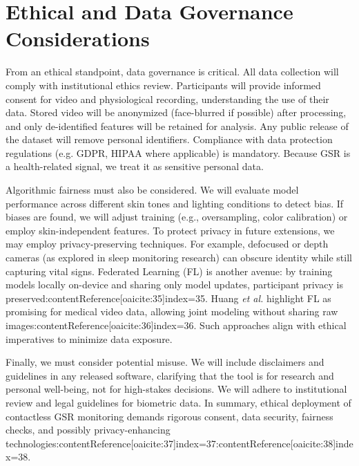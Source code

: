 \documentclass[12pt]{article}
\begin{document}
    \section{Ethical and Data Governance Considerations}
    From an ethical standpoint, data governance is critical. All data collection will comply with institutional ethics review. Participants will provide informed consent for video and physiological recording, understanding the use of their data. Stored video will be anonymized (face-blurred if possible) after processing, and only de-identified features will be retained for analysis. Any public release of the dataset will remove personal identifiers. Compliance with data protection regulations (e.g. GDPR, HIPAA where applicable) is mandatory. Because GSR is a health-related signal, we treat it as sensitive personal data.

    Algorithmic fairness must also be considered. We will evaluate model performance across different skin tones and lighting conditions to detect bias. If biases are found, we will adjust training (e.g., oversampling, color calibration) or employ skin-independent features. To protect privacy in future extensions, we may employ privacy-preserving techniques. For example, defocused or depth cameras (as explored in sleep monitoring research) can obscure identity while still capturing vital signs. Federated Learning (FL) is another avenue: by training models locally on-device and sharing only model updates, participant privacy is preserved:contentReference[oaicite:35]{index=35}. Huang \emph{et al.} highlight FL as promising for medical video data, allowing joint modeling without sharing raw images:contentReference[oaicite:36]{index=36}. Such approaches align with ethical imperatives to minimize data exposure.

    Finally, we must consider potential misuse. We will include disclaimers and guidelines in any released software, clarifying that the tool is for research and personal well-being, not for high-stakes decisions. We will adhere to institutional review and legal guidelines for biometric data. In summary, ethical deployment of contactless GSR monitoring demands rigorous consent, data security, fairness checks, and possibly privacy-enhancing technologies:contentReference[oaicite:37]{index=37}:contentReference[oaicite:38]{index=38}.
\end{document}
